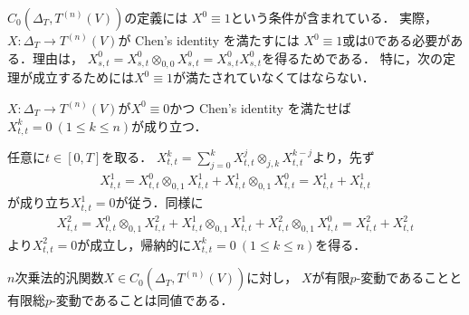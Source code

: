 	$C_0 \left(\Delta_T,T^{(n)}(V) \right)$の定義には
	$X^0 \equiv 1$という条件が含まれている．
	実際，$X:\Delta_T \longrightarrow T^{(n)}(V)$が Chen's identity を満たすには
	$X^0 \equiv 1$或は0である必要がある．理由は，
	$X^0_{s,t} = X^0_{s,t} \otimes_{0,0} X^0_{s,t} = X^0_{s,t}X^0_{s,t}$を得るためである．
	特に，次の定理が成立するためには$X^0 \equiv 1$が満たされていなくてはならない．
	\begin{screen}
		\begin{lem}\label{lem:multiplicative_functional_vanishes_on_diagonal}
			$X:\Delta_T \longrightarrow T^{(n)}(V)$が$X^0 \equiv 0$かつ
			Chen's identity を満たせば$X^k_{t,t} = 0\ (1 \leq k \leq n)$が成り立つ．
		\end{lem}
	\end{screen}
	
	\begin{prf}
		任意に$t \in [0,T]$を取る．
		$X^k_{t,t} = \sum_{j=0}^{k} X^j_{t,t} \otimes_{j,k} X^{k-j}_{t,t}$より，先ず
		\begin{align}
			X^1_{t,t} = X^0_{t,t} \otimes_{0,1} X^1_{t,t} + X^1_{t,t} \otimes_{0,1} X^0_{t,t}
			= X^1_{t,t} + X^1_{t,t}
		\end{align}
		が成り立ち$X^1_{t,t} = 0$が従う．同様に
		\begin{align}
			X^2_{t,t} = X^0_{t,t} \otimes_{0,1} X^2_{t,t} + X^1_{t,t} \otimes_{0,1} X^1_{t,t}
				+ X^2_{t,t} \otimes_{0,1} X^0_{t,t}
			= X^2_{t,t} + X^2_{t,t}
		\end{align}
		より$X^2_{t,t} = 0$が成立し，帰納的に$X^k_{t,t} = 0\ (1 \leq k \leq n)$を得る．
		\QED
	\end{prf}
	
	\begin{screen}
		\begin{thm}
			$n$次乗法的汎関数$X \in C_0 \left(\Delta_T,T^{(n)}(V) \right)$に対し，
			$X$が有限$p$-変動であることと有限総$p$-変動であることは同値である．
		\end{thm}
	\end{screen}
	
